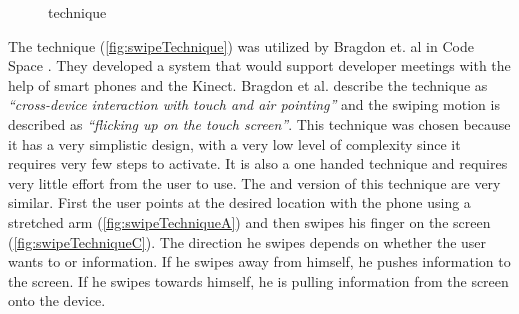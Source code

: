 \begin{figure}[H]
	\caption{\push \grab technique}
	\label{fig:grabTechnique}
\end{figure}

The \swipe technique (\cref{fig:swipeTechnique}) was utilized by Bragdon et. al in Code Space \cite{Bragdon:2011}.
They developed a system that would support developer meetings with the help of smart phones and the Kinect. 
Bragdon et al. describe the technique as \emph{``cross-device interaction with touch and air pointing''} and the swiping motion is described as \emph{``flicking up on the touch screen''}.
This technique was chosen because it has a very simplistic design, with a very low level of complexity since it requires very few steps to activate.
It is also a one handed technique and requires very little effort from the user to use.
The \push and \pull version of this technique are very similar.
First the user points at the desired location with the phone using a stretched arm (\cref{fig:swipeTechniqueA}) and then swipes his finger on the screen (\cref{fig:swipeTechniqueC}).
The direction he swipes depends on whether the user wants to \push or \pull information.
If he swipes away from himself, he pushes information to the screen.
If he swipes towards himself, he is pulling information from the screen onto the device.  

